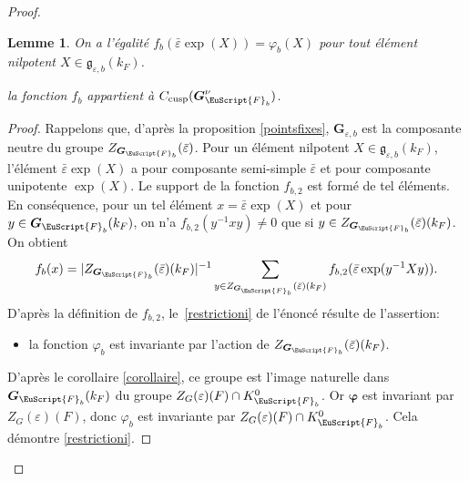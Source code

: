 \documentclass[JEP,XML,SOM,Unicode,francais]{cedram}
\let\mathcal \EuScript
\let\oldenumerate\enumerate
\renewcommand{\enumerate}{\oldenumerate\itemindent0pt}
\newenvironment{enumeratei}
{\bgroup\def\theenumi{\roman{enumi}}\def\theenumii{\arabic{enumii}}\oldenumerate}
{\endenumerate\egroup}
\let\epsilon\varepsilon
\newcommand{\frg}{\mathfrak{g}}
\newcommand{\cusp}{\mathrm{cusp}}
\newcommand{\bG}{\boldsymbol{G}}
\newcommand{\cF}{\mathcal{F}}
\theoremstyle{plain}
\newtheorem*{lem*}{Lemme}
\theoremstyle{definition}
\begin{document}
\begin{proof}
\skpt
\begin{lem*}
\begin{enumeratei}
\item\label{restrictioni}
On a l'égalité $f_{b}(\bar{\epsilon}\exp(X))=\varphi_{b}(X)$ pour tout élément nilpotent $X\in \boldsymbol{\frg}_{\epsilon,b}(k_{F})$.

\item\label{restrictionii}
la fonction $f_{b}$ appartient à $ C_{\cusp}(\bG_{\cF_{b}}^{\nu})$.
\end{enumeratei}
\end{lem*}

\begin{proof}
Rappelons que, d'après la proposition \ref{pointsfixes}, $\bG_{\epsilon,b}$ est la composante neutre du groupe $Z_{\bG_{\cF_{b}}}(\bar{\epsilon})$. Pour un élément nilpotent $X\in \boldsymbol{\frg}_{\epsilon,b}(k_{F})$, l'élément $\bar{\epsilon}\exp(X)$ a pour composante semi-simple $\bar{\epsilon}$ et pour composante unipotente $\exp(X)$. Le support de la fonction $f_{b,2}$ est formé de tel éléments. En conséquence, pour un tel élément $x=\bar{\epsilon}\exp(X)$ et pour $y\in \bG_{\cF_{b}}(k_{F})$, on n'a $f_{b,2}(y^{-1} xy)\neq0$ que si $y\in Z_{\bG_{\cF_{b}}}(\bar{\epsilon})(k_{F})$. On obtient
\[
f_{b}(x)=\vert Z_{\bG_{\cF_{b}}}(\bar{\epsilon})(k_{F})\vert ^{-1}\sum_{y\in Z_{\bG_{\cF_{b}}}(\bar{\epsilon})(k_{F})}f_{b,2}(\bar{\epsilon}\exp(y^{-1}Xy)).
\]
D'après la définition de $f_{b,2}$, le~\eqref{restrictioni} de l'énoncé résulte de l'assertion:
\begin{itemize}
\item
la fonction $\varphi_{b}$ est invariante par l'action de $Z_{\bG_{\cF_{b}}}(\bar{\epsilon})(k_{F})$.
\end{itemize}
D'après le corollaire \ref{corollaire}, ce groupe est l'image naturelle dans $\bG_{\cF_{b}}(k_{F})$ du groupe $Z_{G}(\epsilon)(F)\cap K_{\cF_{b}}^0$. Or $\boldsymbol{\varphi}$ est invariant par $Z_{G}(\epsilon)(F)$, donc $\varphi_{b}$ est invariante par $Z_{G}(\epsilon)(F)\cap K_{\cF_{b}}^0$. Cela démontre \eqref{restrictioni}.


\end{proof}
\end{proof}
\end{document}
